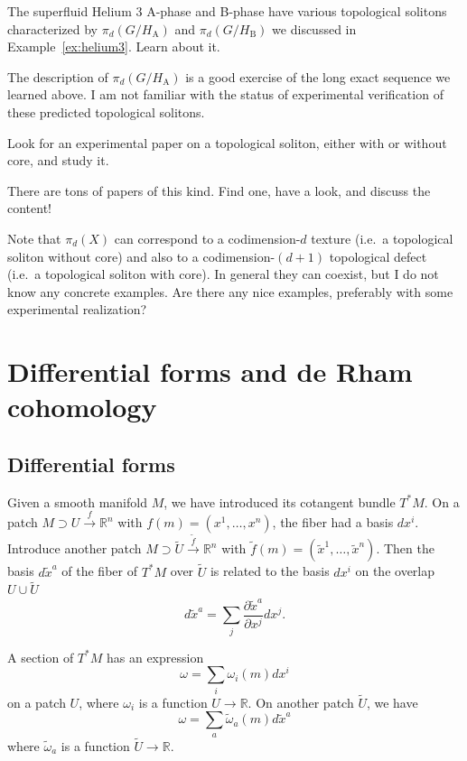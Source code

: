 \documentclass[12pt]{article}
\numberwithin{equation}{section}
\numberwithin{figure}{section}
\theoremstyle{remark}
\def\bR{\mathbb{R}}
\begin{document}
\begin{question}
The superfluid Helium 3 A-phase and B-phase have various topological solitons characterized by $\pi_d(G/H_\text{A})$
and $\pi_d(G/H_\text{B})$ we discussed in Example~\ref{ex:helium3}.
Learn about it. 
\end{question}

The description of $\pi_d(G/H_\text{A})$ is a good exercise of the long exact sequence we learned above.
I am not familiar with the status of experimental verification of these predicted topological solitons.

\begin{question}
Look for an experimental paper on a topological soliton, either with or without core, and study it.
\end{question}
There are tons of papers of this kind. Find one, have a look, and discuss the content!

\begin{question}
Note that $\pi_d(X)$ can correspond to a codimension-$d$ texture (i.e.~a topological soliton without core)
and also to a codimension-$(d+1)$ topological defect (i.e.~a topological soliton with core).
In general they can coexist, but I do not know any concrete examples.
Are there any nice examples, preferably with some experimental realization?
\end{question}

\section{Differential forms and de Rham cohomology}
\label{sec:deRham}

\subsection{Differential forms}
Given a smooth manifold $M$, we have introduced its cotangent bundle $T^*M$.
On a patch $M\supset U \xrightarrow{f} \bR^n$ with $f(m)=(x^1,\ldots,x^n)$,
the fiber had a basis $dx^i$.
Introduce another patch $M\supset \tilde U \xrightarrow{\tilde f} \bR^n$ with $\tilde f(m)=(\tilde x^1,\ldots,\tilde x^n)$.
Then the basis $d\tilde x^a$ of the fiber of $T^*M$ over $\tilde U$ is related to the basis $dx^i$ on the overlap $U\cup \tilde U$ \begin{equation}
  d\tilde x^a = \sum_{j} \frac{\partial \tilde x^a}{\partial x^j} dx^j.
\end{equation}

A section of $T^*M$ has an expression \begin{equation}
  \omega = \sum_i \omega_i(m) dx^i
\end{equation} on a patch $U$, where $\omega_i$ is a function $U\to \bR$.
On another patch $\tilde U$, we have \begin{equation}
  \omega = \sum_a \tilde\omega_a(m) d\tilde x^a
\end{equation} where $\tilde\omega_a$ is a function $\tilde U\to \bR$.
\end{document}
